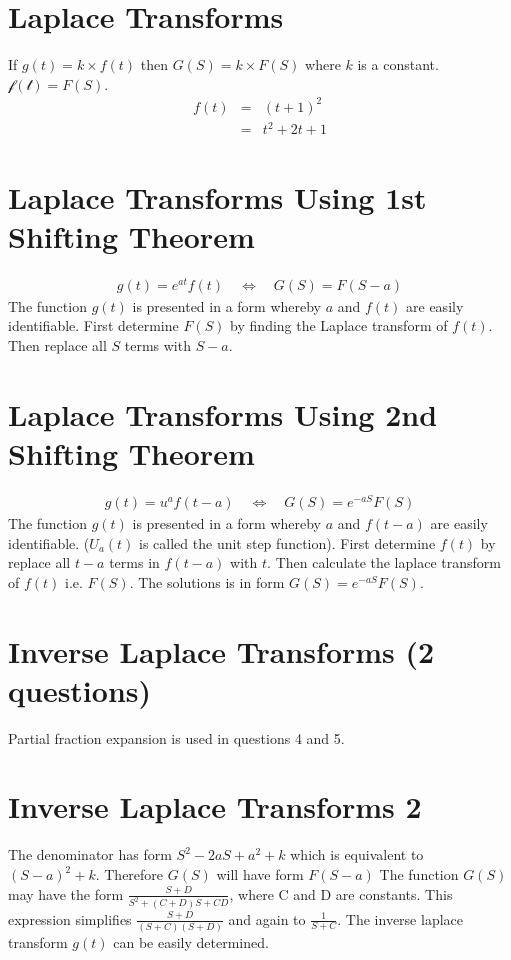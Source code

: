 \documentclass[12pt, a4paper]{article}
\begin{document}
\section{Laplace Transforms }
If $g(t)=k \times f(t)$ then $G(S) = k \times F(S)$ where $k$ is a
constant. $\mathcal{f(t)}=F(S)$.
\begin{eqnarray}
f(t) &=& (t+1)^2\\
&=& t^2 +2t +1 \nonumber
\end{eqnarray}


\section{Laplace Transforms Using 1st Shifting Theorem}
\begin{eqnarray}
 g(t) = e^{at}f(t) \quad \Leftrightarrow \quad G(S)= F(S-a) \nonumber
\end{eqnarray}
The function $g(t)$ is presented in a form whereby $a$ and $f(t)$
are easily identifiable. First determine $F(S)$ by finding the
Laplace transform of $f(t)$. Then replace all $S$ terms with
$S-a$.

\section{Laplace Transforms Using 2nd Shifting Theorem}

\begin{eqnarray}
 g(t) = u^{a}f(t-a) \quad \Leftrightarrow \quad G(S)= e^{-aS}F(S) \nonumber
\end{eqnarray}
The function $g(t)$ is presented in a form whereby $a$ and
$f(t-a)$ are easily identifiable. ($U_{a}(t)$ is called the unit
step function). First determine $f(t)$ by replace all $t-a$ terms
in $f(t-a)$ with $t$. Then calculate the laplace transform of
$f(t)$ i.e. $F(S)$. The solutions is in form $G(S)= e^{-aS}F(S)$.

\section{Inverse Laplace Transforms (2 questions) }
Partial fraction expansion is used in questions 4 and 5.
\section{Inverse Laplace Transforms 2}

The denominator has form $S^2 - 2aS + a^2 + k$ which is equivalent
to $(S-a)^2 + k$. Therefore $G(S)$ will have form $F(S-a)$
\newline
The function $G(S)$ may have the form $\frac{S+D}{S^2 +(C+D)S +
CD}$, where C and D are constants. This expression simplifies
$\frac{S+D}{(S+C)(S+D)}$ and again to $\frac{1}{S+C}$. The inverse
laplace transform $g(t)$ can be easily determined.
\end{document}
